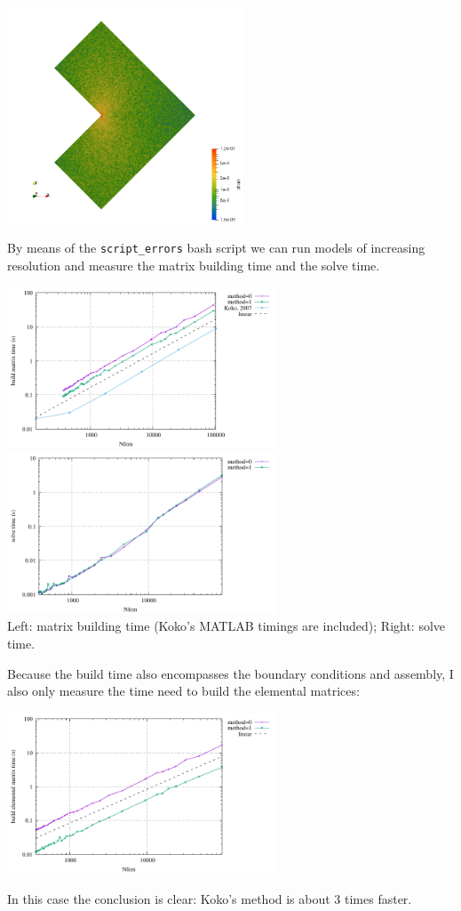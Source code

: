 \begin{center}
\includegraphics[width=7cm]{python_codes/fieldstone_179/RESULTS/strain}
\end{center}

By means of the {\tt script\_errors} bash script we can run models 
of increasing resolution and measure the matrix building time and the 
solve time.
\begin{center}
\includegraphics[width=8cm]{python_codes/fieldstone_179/RESULTS/build.pdf}
\includegraphics[width=8cm]{python_codes/fieldstone_179/RESULTS/solve.pdf}\\
{\captionfont Left: matrix building time (Koko's MATLAB timings are included);
Right: solve time.}
\end{center}

Because the build time also encompasses the boundary conditions and 
assembly, I also only measure the time need to build the elemental 
matrices:
\begin{center}
\includegraphics[width=8cm]{python_codes/fieldstone_179/RESULTS/Ael.pdf}
\end{center}
In this case the conclusion is clear: Koko's method is about 3 times faster.



